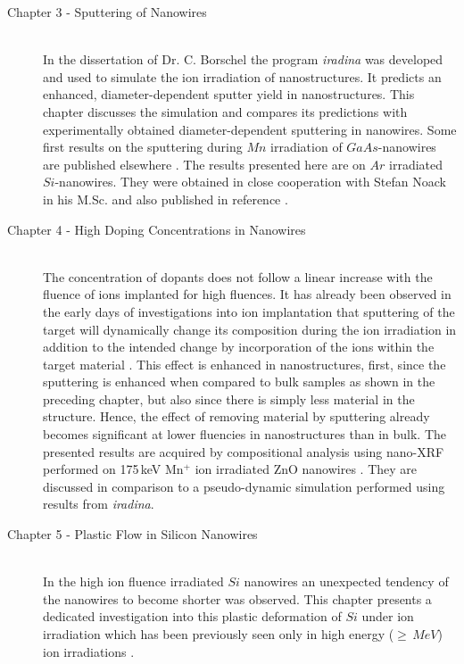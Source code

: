 \begin{description}
  \item[\normalfont Chapter 3 - Sputtering of Nanowires] \hfill \\
  In the dissertation of Dr. C. Borschel \cite{borschel_ion-solid_2012} the program \emph{iradina} \cite{borschel_ion_2011} was developed and used to simulate the ion irradiation of nanostructures. It predicts an enhanced, diameter-dependent sputter yield in nanostructures. This chapter discusses the simulation and compares its predictions with experimentally obtained diameter-dependent sputtering in nanowires. Some first results on the sputtering during $Mn$ irradiation of $GaAs$-nanowires are published elsewhere \cite{johannes_enhanced_2014}. The results presented here are on $Ar$ irradiated $Si$-nanowires. They were obtained in close cooperation with Stefan Noack in his M.Sc. and also published in reference \cite{johannes_anomalous_2015}.
  \item[\normalfont Chapter 4 - High Doping Concentrations in Nanowires] \hfill \\
  The concentration of dopants does not follow a linear increase with the fluence of ions implanted for high fluences. It has already been observed in the early days of investigations into ion implantation that sputtering of the target will dynamically change its composition during the ion irradiation in addition to the intended change by incorporation of the ions within the target material \cite{moller_tridyn_1984,moller_tridyn-binary_1988,miyagawa_computer_1991,sigmund_alloy_1993,eckstein_oscillations_2000}. This effect is enhanced in nanostructures, first, since the sputtering is enhanced when compared to bulk samples as shown in the preceding chapter, but also since there is simply less material in the structure. Hence, the effect of removing material by sputtering already becomes significant at lower fluencies in nanostructures than in bulk. The presented results are acquired by compositional analysis using nano-XRF performed on 175\,keV Mn$^+$ ion irradiated ZnO nanowires \cite{johannes_enhanced_2014}. They are discussed in comparison to a pseudo-dynamic simulation performed using results from \emph{iradina}.
  \item[\normalfont Chapter 5 - Plastic Flow in Silicon Nanowires] \hfill \\
  In the high ion fluence irradiated $Si$ nanowires an unexpected tendency of the nanowires to become shorter was observed. This chapter presents a dedicated investigation into this plastic deformation of $Si$ under ion irradiation which has been previously seen only in high energy ($\ge\,MeV$) ion irradiations \cite{volkert_stress_1991,trinkaus_viscoelastic_1995,hedler_amorphous_2004,hedler_boundary_2005}.
\end{description}
